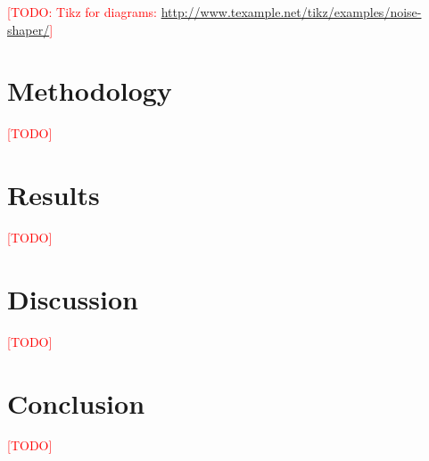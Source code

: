 \documentclass[a4paper]{IEEEtran}
\newcommand\TODO{\textcolor{red}{[TODO]}}
\newcommand\todo[1]{\textcolor{red}{[TODO: #1]}}
\begin{document}
\todo{Tikz for diagrams: \url{http://www.texample.net/tikz/examples/noise-shaper/}}

\section{Methodology}

\TODO

\section{Results}

\TODO

\section{Discussion}

\TODO

\section{Conclusion}

\TODO



\end{document}

